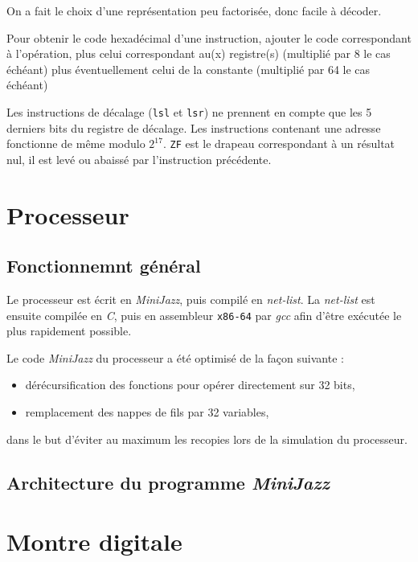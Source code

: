 \documentclass[a4paper, 10pt, french]{article}
\newcommand{\code}[1]{\texttt{#1}}
\newcommand{\foreign}[1]{\emph{#1}}
\begin{document}
On a fait le choix d'une représentation peu factorisée, donc facile à décoder.

Pour obtenir le code hexadécimal d’une instruction, ajouter le code correspondant à l’opération, plus celui correspondant au(x) registre(s) (multiplié par 8 le cas échéant) plus éventuellement celui de la constante (multiplié par 64 le cas échéant)

Les instructions de décalage (\code{lsl} et \code{lsr}) ne prennent en compte que les 5 derniers bits du registre de décalage. Les instructions contenant une adresse fonctionne de même modulo $2^{17}$. \code{ZF} est le drapeau correspondant à un résultat nul, il est levé ou abaissé par l'instruction précédente.




\section{Processeur}

\subsection{Fonctionnemnt général}

Le processeur est écrit en \foreign{MiniJazz}, puis compilé en \foreign{net-list}. La \foreign{net-list} est ensuite compilée en \foreign{C}, puis en assembleur \code{x86-64} par \foreign{gcc} afin d'être exécutée le plus rapidement possible.

Le code \foreign{MiniJazz} du processeur a été optimisé de la façon suivante :
\begin{itemize}
 \item dérécursification des fonctions pour opérer directement sur 32 bits,
 \item remplacement des nappes de fils par 32 variables,
\end{itemize} dans le but d'éviter au maximum les recopies lors de la simulation du processeur.

\subsection{Architecture du programme \foreign{MiniJazz}}




\section{Montre digitale}
\end{document}
